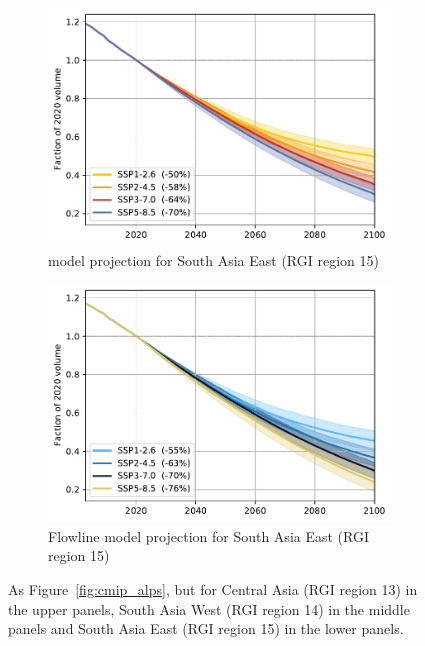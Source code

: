 \begin{figure}[htp]
          \begin{subfigure}[b]{0.476\textwidth}
              \caption{\Vas{} model projection for South Asia East (RGI region 15) }
              \label{fig:cmip:vas_reg_15}
              \centering
              \includegraphics[width=\textwidth]{../plots/final_plots/time_series/cmip/cmip_vas_15.pdf}
          \end{subfigure}
          \hfill
          \begin{subfigure}[b]{0.476\textwidth}
              \caption{Flowline model projection for South Asia East (RGI region 15) }
              \label{fig:cmip:fl_reg_15}
              \centering
              \includegraphics[width=\textwidth]{../plots/final_plots/time_series/cmip/cmip_fl_15.pdf}
          \end{subfigure}

          \caption{As Figure~\ref{fig:cmip_alps}, but for Central Asia (RGI region 13) in the upper panels, South Asia West (RGI region 14) in the middle panels and South Asia East (RGI region 15) in the lower panels.}
          \label{fig:cmip_hma}
      \end{figure}

